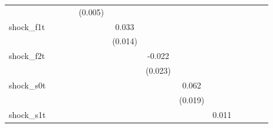{\begin{tabular}{l*{12}{c}}
            &                     &                     &                     &     (0.005)         &                     &                     &                     &                     &                     &                     &                     &                     \\
\addlinespace
shock\_f1t   &                     &                     &                     &                     &       0.033\sym{**} &                     &                     &                     &                     &                     &                     &                     \\
            &                     &                     &                     &                     &     (0.014)         &                     &                     &                     &                     &                     &                     &                     \\
\addlinespace
shock\_f2t   &                     &                     &                     &                     &                     &      -0.022         &                     &                     &                     &                     &                     &                     \\
            &                     &                     &                     &                     &                     &     (0.023)         &                     &                     &                     &                     &                     &                     \\
\addlinespace
shock\_s0t   &                     &                     &                     &                     &                     &                     &       0.062\sym{***}&                     &                     &                     &                     &                     \\
            &                     &                     &                     &                     &                     &                     &     (0.019)         &                     &                     &                     &                     &                     \\
\addlinespace
shock\_s1t   &                     &                     &                     &                     &                     &                     &                     &       0.011         &                     &                     &                     &                     \\

\end{tabular}}
